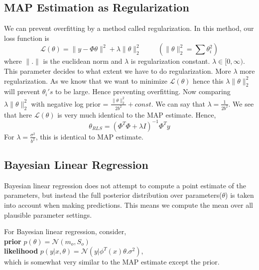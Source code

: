 \documentclass[12pt]{article}
\numberwithin{equation}{section}
\begin{document}
{\subsection{MAP Estimation as Regularization}
We can prevent overfitting by a method called regularization. In this method, our loss function is 
\begin{equation*}
	\mathcal{L}(\theta) = \|y - \Phi\theta\|^{2} + \lambda \|\theta\|_{2}^2 \hspace{1cm} (\|\theta\|_2^2 = \sum\theta^2_{i})
\end{equation*}
where $\|.\|$ is the euclidean norm and $\lambda$ is regularization constant. $\lambda \in [0, \infty)$. This parameter decides to what extent we have to do regularization. More $\lambda$ more regularization. As we know that we want to minimize $\mathcal{L}(\theta)$ hence this $\lambda \|\theta\|_2^2$ will prevent $\theta_{i}'s$ to be large. Hence preventing overfitting. Now comparing $\lambda \|\theta\|_2^2$ with negative log prior = $\frac{\|\theta\|_2^2}{2b^2} + const$. We can say that $\lambda = \frac{1}{2b^2}$. We see that here $\mathcal{L}(\theta)$ is very much identical to the MAP estimate. Hence, 
\begin{equation*}
	\theta_{RLS} = (\Phi^T\Phi + \lambda I)^{-1}\Phi^Ty
\end{equation*}
For $\lambda = \frac{\sigma^2}{b^2}$, this is identical to MAP estimate.
\subsection{Bayesian Linear Regression}
Bayesian linear regression does not attempt to compute a point estimate of the parameters, but instead the full posterior distribution over parameters($\theta$) is taken into account when making predictions. This means we compute the mean over all plausible parameter settings.

\noindent
For Bayesian linear regression, consider,\\
\textbf{prior} $p(\theta) = \mathcal{N}(m_o, S_o)$\\
\textbf{likelihood} $p(y|x, \theta) = \mathcal{N}(y|\phi^T(x)\theta. \sigma^2)$,\\
which is somewhat very similar to the MAP estimate except the prior.

}
\end{document}

